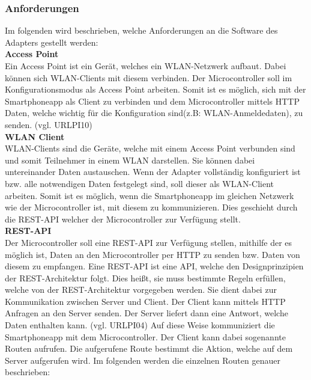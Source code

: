 \documentclass[]{article}
\begin{document}
\subsubsection{Anforderungen}
Im folgenden wird beschrieben, welche Anforderungen an die Software des Adapters gestellt werden: \newline \\
\textbf{Access Point} \\
Ein Access Point ist ein Gerät, welches ein WLAN-Netzwerk aufbaut. Dabei können sich WLAN-Clients mit diesem verbinden.
Der Microcontroller soll im Konfigurationsmodus als Access Point arbeiten. Somit ist es möglich, sich mit der Smartphoneapp als Client zu verbinden und dem Microcontroller mittels HTTP Daten, welche wichtig für die Konfiguration sind(z.B: WLAN-Anmeldedaten), zu senden.  (vgl. URLPI10) \newline \\
\textbf{WLAN Client} \\
WLAN-Clients sind die Geräte, welche mit einem Access Point verbunden sind und somit Teilnehmer in einem WLAN darstellen. Sie können dabei untereinander Daten austauschen.
Wenn der Adapter vollständig konfiguriert ist bzw. alle notwendigen Daten festgelegt sind, soll dieser als WLAN-Client arbeiten. Somit ist es möglich, wenn die Smartphoneapp im gleichen Netzwerk wie der Microcontroller ist, mit diesem zu kommunizieren. Dies geschieht durch die REST-API welcher der Microcontroller zur Verfügung stellt. \newline \\
\textbf{REST-API} \\
Der Microcontroller soll eine REST-API zur Verfügung stellen, mithilfe der es möglich ist, Daten an den Microcontroller per HTTP zu senden bzw. Daten von diesem zu empfangen. Eine REST-API ist eine API, welche den Designprinzipien der REST-Architektur folgt. Dies heißt, sie muss bestimmte Regeln erfüllen, welche von der REST-Architektur vorgegeben werden. Sie dient dabei zur Kommunikation zwischen Server und Client. Der Client kann mittels HTTP Anfragen an den Server senden. Der Server liefert dann eine Antwort, welche Daten enthalten kann. (vgl. URLPI04) Auf diese Weise kommuniziert die Smartphoneapp mit dem Microcontroller. Der Client kann dabei sogenannte Routen aufrufen. Die aufgerufene Route bestimmt die Aktion, welche auf dem Server aufgerufen wird. Im folgenden werden die einzelnen Routen genauer beschrieben: \newline \\
\end{document}
